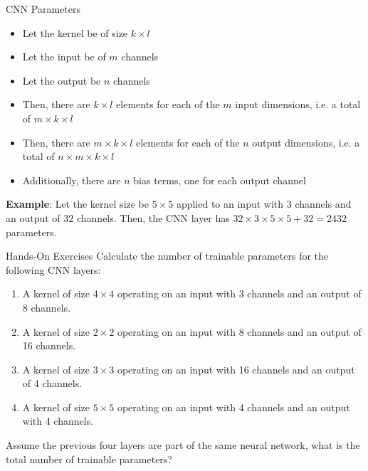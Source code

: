 \documentclass[ignorenonframetext,xcolor=x11names]{beamer}
\begin{document}
\begin{frame}{CNN Parameters}
\small
\begin{itemize}
  \item Let the kernel be of size $k \times l$
  \item Let the input be of $m$ channels
  \item Let the output be $n$ channels
  \item Then, there are $k \times l$ elements for each of the $m$ input dimensions, i.e. a total of $m \times k \times l$
  \item Then, there are $m \times k \times l$ elements for each of the $n$ output dimensions, i.e. a total of $n \times m \times k \times l$
  \item Additionally, there are $n$ bias terms, one for each output channel
\end{itemize}
\textbf{Example}: Let the kernel size be $5 \times 5$ applied to an input with $3$ channels and an output of $32$ channels. Then, the CNN layer has $32 \times 3 \times 5 \times 5 + 32 = 2432$ parameters.
\end{frame}


\begin{frame}{Hands-On Exercises}
Calculate the number of trainable parameters for the following CNN layers:
\begin{enumerate}
\item A kernel of size $4 \times 4$ operating on an input with 3 channels and an output of 8 channels.
\item A kernel of size $2 \times 2$ operating on an input with 8 channels and an output of 16 channels.
\item A kernel of size $3 \times 3$ operating on an input with 16 channels and an output of 4 channels.
\item A kernel of size $5 \times 5$ operating on an input with 4 channels and an output with 4 channels.
\end{enumerate}
Assume the previous four layers are part of the same neural network, what is the total number of trainable parameters?
\end{frame}
\end{document}
